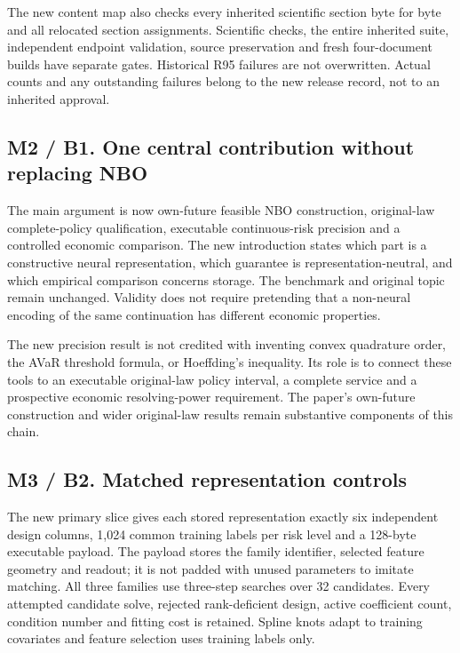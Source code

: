 The new content map also checks every inherited scientific section byte
for byte and all relocated section assignments. Scientific checks, the
entire inherited suite, independent endpoint validation, source
preservation and fresh four-document builds have separate gates.
Historical R95 failures are not overwritten. Actual counts and any
outstanding failures belong to the new release record, not to an
inherited approval.

\hypertarget{m2-b1.-one-central-contribution-without-replacing-nbo}{%
\subsection{M2 / B1. One central contribution without replacing
NBO}\label{m2-b1.-one-central-contribution-without-replacing-nbo}}

The main argument is now own-future feasible NBO construction,
original-law complete-policy qualification, executable continuous-risk
precision and a controlled economic comparison. The new introduction
states which part is a constructive neural representation, which
guarantee is representation-neutral, and which empirical comparison
concerns storage. The benchmark and original topic remain unchanged.
Validity does not require pretending that a non-neural encoding of the
same continuation has different economic properties.

The new precision result is not credited with inventing convex
quadrature order, the AVaR threshold formula, or Hoeffding's inequality.
Its role is to connect these tools to an executable original-law policy
interval, a complete service and a prospective economic resolving-power
requirement. The paper's own-future construction and wider original-law
results remain substantive components of this chain.

\hypertarget{m3-b2.-matched-representation-controls}{%
\subsection{M3 / B2. Matched representation
controls}\label{m3-b2.-matched-representation-controls}}

The new primary slice gives each stored representation exactly six
independent design columns, 1,024 common training labels per risk level
and a 128-byte executable payload. The payload stores the family
identifier, selected feature geometry and readout; it is not padded with
unused parameters to imitate matching. All three families use three-step
searches over 32 candidates. Every attempted candidate solve, rejected
rank-deficient design, active coefficient count, condition number and
fitting cost is retained. Spline knots adapt to training covariates and
feature selection uses training labels only.

